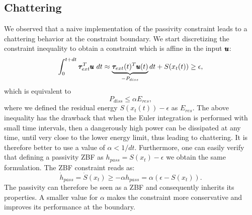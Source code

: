 \subsection{Chattering}
We observed that a naive implementation of the passivity constraint leads to a chattering behavior at the constraint boundary. We start discretizing the constraint inequality to obtain a constraint which is affine in the input $\pmb{u}$:
\begin{equation*}
    \int_{0}^{t + dt} \boldsymbol{\tau}_{ext}^T \pmb{u} \ dt \approx \underbrace{\boldsymbol{\tau}_{ext}(t)^T \pmb{u}(t) }_{-P_{diss}}dt + S(x_t(t)) \geq \epsilon,
\end{equation*}
which is equivalent to 
\begin{equation} \label{eq:passivity_simple}
    P_{diss} \leq \alpha E_{res},
\end{equation}
where we defined the residual energy $S(x_t(t))-\epsilon$ as $E_{res}$. The above inequality has the drawback that when the Euler integration is performed with small time intervals, then a dangerously high power can be dissipated at any time, until very close to the lower energy limit, thus leading to chattering. It is therefore better to use a value of $\alpha < 1/dt$. Furthermore, one can easily verify that defining a passivity ZBF as $h_{pass} = S(x_t) - \epsilon$ we obtain the same formulation. The ZBF constraint reads as:
\begin{equation*}
    \dot{h}_{pass} = \dot{S}(x_t) \geq -\alpha h_{pass}
     =\alpha (\epsilon - S(x_t)).
\end{equation*}
The passivity can therefore be seen as a ZBF and consequently inherits its properties. A smaller value for $\alpha$ makes the constraint more conservative and improves its performance at the boundary. 

